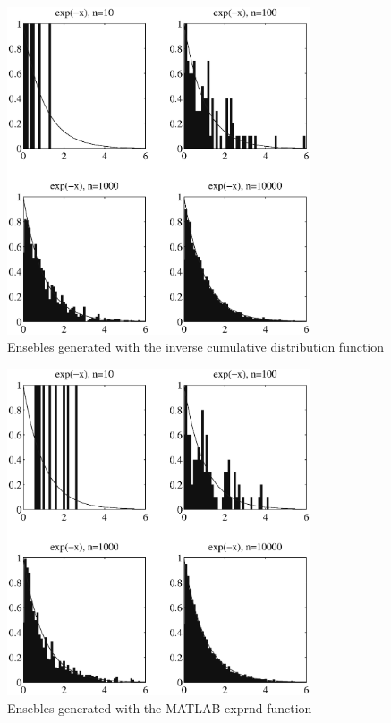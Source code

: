 \documentclass[fleqn, letterpaper]{tufte-handout}
\begin{document}
\begin{figure}
    \includegraphics[width=0.8\textwidth]{problem1}
    \caption{Ensebles generated with the inverse cumulative distribution function}
    \label{rand}
\end{figure}
\begin{figure}
    \includegraphics[width=0.8\textwidth]{problem1e}
    \caption{Ensebles generated with the MATLAB {\ttfamily exprnd} function}
    \label{exprnd}
\end{figure}
\end{document}
